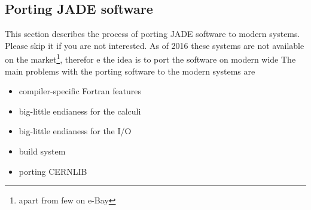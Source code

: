 \subsection{Porting JADE software}
This section describes the process of porting JADE software to modern systems.
Please skip it if you are not interested.
As of 2016 these systems are not available on the market\footnote{apart from few on e-Bay},
therefor e the idea is to port the software on modern wide 
The main problems with the porting software to the modern systems are
\begin{itemize}
\item  compiler-specific Fortran features
\item  big-little endianess for the calculi
\item  big-little endianess for the I/O
\item  build system 
\item  porting CERNLIB
\end{itemize}

